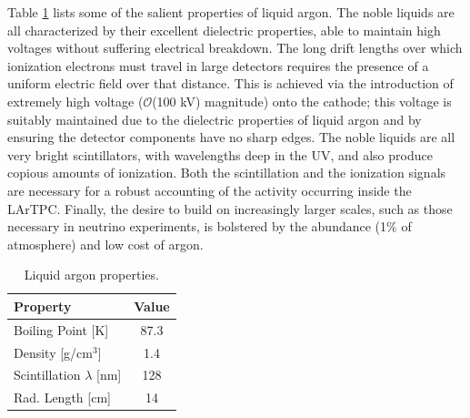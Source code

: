 Table \ref{tab:nobleparam} lists some of the salient properties of liquid argon.  The noble liquids are all characterized by their excellent dielectric properties, able to maintain high voltages without suffering electrical breakdown.  The long drift lengths over which ionization electrons must travel in large \lartpc detectors requires the presence of a uniform electric field over that distance.  This is achieved via the introduction of extremely high voltage ($\mathcal{O}$(100 kV) magnitude) onto the \lartpc cathode; this voltage is suitably maintained due to the dielectric properties of liquid argon and by ensuring the detector components have no sharp edges.  The noble liquids are all very bright scintillators, with wavelengths deep in the UV, and also produce copious amounts of ionization.  Both the scintillation and the ionization signals are necessary for a robust accounting of the activity occurring inside the LArTPC.  Finally, the desire to build \lartpcs on increasingly larger scales, such as those necessary in neutrino experiments, is bolstered by the abundance (1$\%$ of atmosphere) and low cost of argon.

\begin{table}[!htb]
   \centering
    \caption{Liquid argon properties.} 
      \begin{tabular}{lc} %
      \hline
      Property & Value\\
    \hline
   Boiling Point [K] & 87.3\\
   Density [g/cm$^3$] & 1.4\\
   Scintillation $\lambda$ [nm] & 128 \\
   Rad. Length [cm] & 14\\
   \hline
   \end{tabular}

   \label{tab:nobleparam}
\end{table} 



